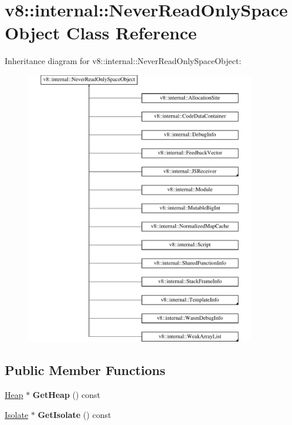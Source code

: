 \hypertarget{classv8_1_1internal_1_1NeverReadOnlySpaceObject}{}\section{v8\+:\+:internal\+:\+:Never\+Read\+Only\+Space\+Object Class Reference}
\label{classv8_1_1internal_1_1NeverReadOnlySpaceObject}
Inheritance diagram for v8\+:\+:internal\+:\+:Never\+Read\+Only\+Space\+Object\+:\begin{figure}[H]
\begin{center}
\leavevmode
\includegraphics[height=12.000000cm]{classv8_1_1internal_1_1NeverReadOnlySpaceObject}
\end{center}
\end{figure}
\subsection*{Public Member Functions}
\begin{DoxyCompactItemize}
\item 
\mbox{\label{classv8_1_1internal_1_1NeverReadOnlySpaceObject_a12b5e1f99f43218a6b7bafb5f035e314}} 
\mbox{\hyperlink{classv8_1_1internal_1_1Heap}{Heap}} $\ast$ {\bfseries Get\+Heap} () const
\item 
\mbox{\label{classv8_1_1internal_1_1NeverReadOnlySpaceObject_a2e6eaa6acf16b1cf533d92e317a21ce3}} 
\mbox{\hyperlink{classv8_1_1internal_1_1Isolate}{Isolate}} $\ast$ {\bfseries Get\+Isolate} () const
\end{DoxyCompactItemize}


